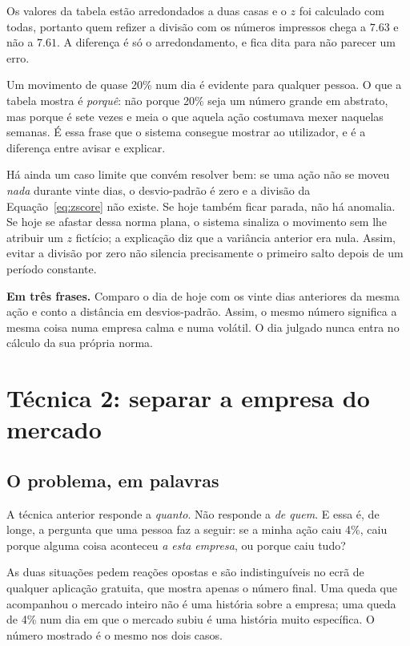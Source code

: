 Os valores da tabela estão arredondados a duas casas e o $z$ foi calculado com todas, portanto
quem refizer a divisão com os números impressos chega a $7.63$ e não a $7.61$. A diferença é só o
arredondamento, e fica dita para não parecer um erro.

Um movimento de quase 20\% num dia é evidente para qualquer pessoa. O que a tabela mostra é
\emph{porquê}: não porque 20\% seja um número grande em abstrato, mas porque é sete vezes e meia o
que aquela ação costumava mexer naquelas semanas. É essa frase que o sistema consegue mostrar ao
utilizador, e é a diferença entre avisar e explicar.

Há ainda um caso limite que convém resolver bem: se uma ação não se moveu \emph{nada} durante
vinte dias, o desvio-padrão é zero e a divisão da Equação~\ref{eq:zscore} não existe. Se hoje também
ficar parada, não há anomalia. Se hoje se afastar dessa norma plana, o sistema sinaliza o movimento
sem lhe atribuir um $z$ fictício; a explicação diz que a variância anterior era nula. Assim, evitar
a divisão por zero não silencia precisamente o primeiro salto depois de um período constante.

\begin{tcolorbox}[colback=black!3, colframe=black!30, boxrule=0.4pt, arc=2pt]
\textbf{Em três frases.} Comparo o dia de hoje com os vinte dias anteriores da mesma ação e conto a
distância em desvios-padrão. Assim, o mesmo número significa a mesma coisa numa empresa calma e numa
volátil. O dia julgado nunca entra no cálculo da sua própria norma.
\end{tcolorbox}

\section{Técnica 2: separar a empresa do mercado}
\label{sec:met_decomposicao}

\subsection{O problema, em palavras}

A técnica anterior responde a \emph{quanto}. Não responde a \emph{de quem}. E essa é, de longe, a
pergunta que uma pessoa faz a seguir: se a minha ação caiu 4\%, caiu porque alguma coisa aconteceu
\emph{a esta empresa}, ou porque caiu tudo?

As duas situações pedem reações opostas e são indistinguíveis no ecrã de qualquer aplicação
gratuita, que mostra apenas o número final. Uma queda que acompanhou o mercado inteiro não é uma
história sobre a empresa; uma queda de 4\% num dia em que o mercado subiu é uma história muito
específica. O número mostrado é o mesmo nos dois casos.

